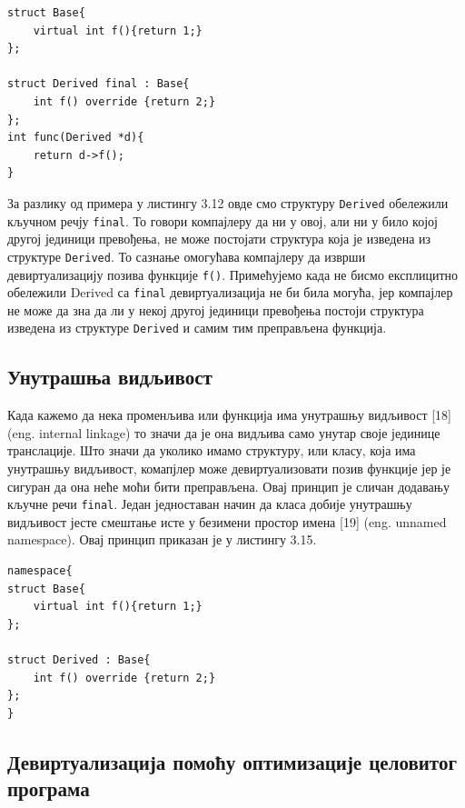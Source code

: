 \documentclass[12pt,oneside]{memoir}
\begin{document}
\begin{lstlisting}[frame=single,caption={Пример са кључном речју final }, captionpos=b]
struct Base{
    virtual int f(){return 1;}
};

struct Derived final : Base{
    int f() override {return 2;}
};
int func(Derived *d){
    return d->f();
}

\end{lstlisting}
 
 За разлику од примера у листингу 3.12 овде смо структуру \texttt{Derived} обележили кључном 
 речју \texttt{final}.
 То говори компајлеру да ни у овој, али ни у било којој другој јединици превођења, 
 не може постојати структура која је изведена из структуре \texttt{Derived}.
 То сазнање омогућава компајлеру да изврши девиртуализацију позива функције \texttt{f()}.
 Примећујемо када не бисмо експлицитно обележили  Derived са \texttt{final} девиртуализација
 не би била могућа, јер компајлер не може да зна да ли у некој другој јединици превођења
 постоји структура изведена из структуре \texttt{Derived} и самим тим преправљена функција.
 
 \subsection{Унутрашња видљивост}
 Када кажемо да нека променљива или функција има унутрашњу видљивост [18]
 (eng. internal linkage) то значи да је она видљива само унутар своје јединице
 транслације.
 Што значи да уколико имамо структуру, или класу, која има унутрашњу видљивост,
 комапјлер може девиртуализовати позив функције јер је сигуран да она неће моћи бити
 преправљена.
 Овај принцип је сличан додавању кључне речи  \texttt{final}.
 Један једноставан начин да класа добије унутрашњу видљивост јесте смештање исте
 у безимени простор имена [19] (eng. unnamed namespace).
 Овај принцип приказан је у листингу 3.15.
 
 \begin{lstlisting}[frame=single,caption={Пример са унутрашњом видљивости}, captionpos=b]
namespace{
struct Base{
    virtual int f(){return 1;}
};

struct Derived : Base{
    int f() override {return 2;}
};
}
\end{lstlisting}
 
\subsection{Девиртуализација помоћу оптимизације целовитог програма}
 
\end{document}
